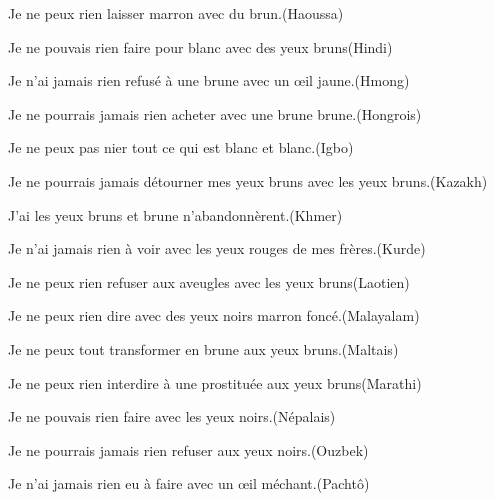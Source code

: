 \documentclass[a4paper, 11pt]{article}
\begin{document}
\begin{outputcbox}
Je ne peux rien laisser marron avec du brun.\hfill(Haoussa)
\end{outputcbox}
\begin{outputcbox}
Je ne pouvais rien faire pour blanc avec des yeux bruns\hfill(Hindi)
\end{outputcbox}
\begin{outputcbox}
Je n'ai jamais rien refusé à une brune avec un œil jaune.\hfill(Hmong)
\end{outputcbox}
\begin{outputcbox}
Je ne pourrais jamais rien acheter avec une brune brune.\hfill(Hongrois)
\end{outputcbox}
\begin{outputcbox}
Je ne peux pas nier tout ce qui est blanc et blanc.\hfill(Igbo)
\end{outputcbox}
\begin{outputcbox}
Je ne pourrais jamais détourner mes yeux bruns avec les yeux bruns.\hfill(Kazakh)
\end{outputcbox}
\begin{outputcbox}
J'ai les yeux bruns et brune n'abandonnèrent.\hfill(Khmer)
\end{outputcbox}
\begin{outputcbox}
Je n'ai jamais rien à voir avec les yeux rouges de mes frères.\hfill(Kurde)
\end{outputcbox}
\begin{outputcbox}
Je ne peux rien refuser aux aveugles avec les yeux bruns\hfill(Laotien)
\end{outputcbox}
\begin{outputcbox}
Je ne peux rien dire avec des yeux noirs marron foncé.\hfill(Malayalam)
\end{outputcbox}
\begin{outputcbox}
Je ne peux tout transformer en brune aux yeux bruns.\hfill(Maltais)
\end{outputcbox}
\begin{outputcbox}
Je ne peux rien interdire à une prostituée aux yeux bruns\hfill(Marathi)
\end{outputcbox}
\begin{outputcbox}
Je ne pouvais rien faire avec les yeux noirs.\hfill(Népalais)
\end{outputcbox}
\begin{outputcbox}
Je ne pourrais jamais rien refuser aux yeux noirs.\hfill(Ouzbek)
\end{outputcbox}
\begin{outputcbox}
Je n'ai jamais rien eu à faire avec un œil méchant.\hfill(Pachtô)
\end{outputcbox}
\end{document}

